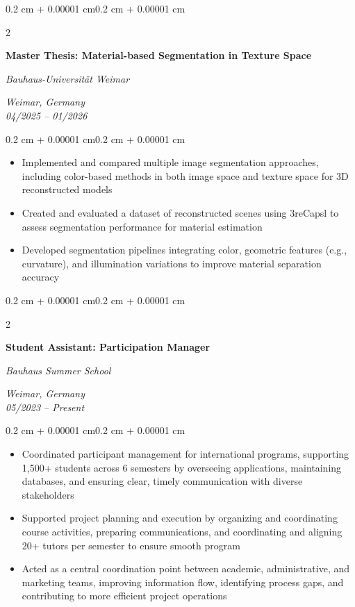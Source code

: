 \documentclass[10pt, a4paper]{article}
\newenvironment{highlights}{
    \begin{itemize}[
        topsep=0.08 cm,
        parsep=0.08 cm,
        partopsep=0pt,
        itemsep=0pt,
        leftmargin=0.4 cm + 10pt
    ]
}{
    \end{itemize}
}
\newenvironment{onecolentry}{
    \begin{adjustwidth}{0.2 cm + 0.00001 cm}{0.2 cm + 0.00001 cm}
}{
    \end{adjustwidth}
}
\newenvironment{twocolentry}[2][]{
    \onecolentry
    \def\secondColumn{#2}
    \setcolumnwidth{\fill, 4.5 cm}
    \begin{paracol}{2}
}{
    \switchcolumn \raggedleft \secondColumn
    \end{paracol}
    \endonecolentry
}
\begin{document}
\begin{twocolentry}{\textit{Weimar, Germany}\\\textit{04/2025 -- 01/2026}}
    \textbf{Master Thesis: Material-based Segmentation in Texture Space}

    \textit{Bauhaus-Universität Weimar}
\end{twocolentry}

\vspace{0.10 cm}
\begin{onecolentry}
    \begin{highlights}
        \item Implemented and compared multiple image segmentation approaches, including color-based methods in both image space and texture space for 3D reconstructed models
        \item Created and evaluated a dataset of reconstructed scenes using 3reCapsl to assess segmentation performance for material estimation
        \item Developed segmentation pipelines integrating color, geometric features (e.g., curvature), and illumination variations to improve material separation accuracy
    \end{highlights}
\end{onecolentry}

\vspace{0.15cm}

\begin{twocolentry}{\textit{Weimar, Germany}\\\textit{05/2023 -- Present}}
    \textbf{Student Assistant: Participation Manager}

    \textit{Bauhaus Summer School}
\end{twocolentry}

\vspace{0.10 cm}
\begin{onecolentry}
    \begin{highlights}
        \item Coordinated participant management for international programs, supporting 1,500+ students across 6 semesters by overseeing applications, maintaining databases, and ensuring clear, timely communication with diverse stakeholders
        \item Supported project planning and execution by organizing and coordinating course activities, preparing communications, and coordinating and aligning 20+ tutors per semester to ensure smooth program
        \item Acted as a central coordination point between academic, administrative, and marketing teams, improving information flow, identifying process gaps, and contributing to more efficient project operations
    \end{highlights}
\end{onecolentry}
\end{document}
